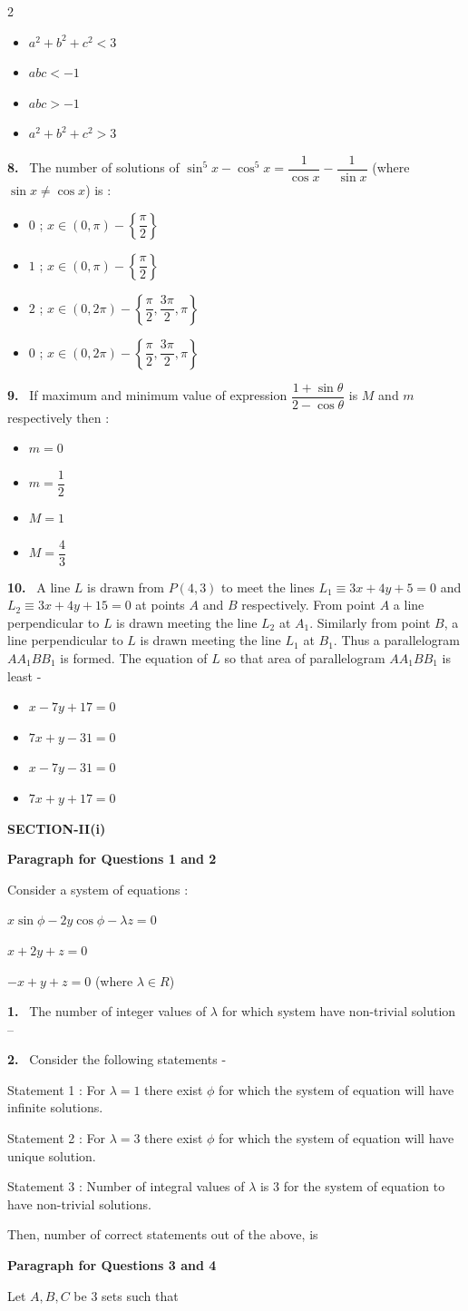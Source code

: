 \documentclass[10pt]{extarticle}
\newcommand{\sect}[1]{\par\smallskip\noindent\textbf{#1}\par}
\newcommand{\qn}[1]{\par\smallskip\noindent\textbf{#1.}~}
\newcommand{\paraq}[2]{\par\smallskip\noindent\textbf{Paragraph for Questions #1 and #2}\par}
\newenvironment{qoptions}{\begin{itemize}[leftmargin=1.8em,itemsep=1pt,topsep=2pt,label={}]}{\end{itemize}}
\newcommand{\opt}[2]{\item[(#1)] #2}
\begin{document}
\begin{multicols}{2}
\begin{qoptions}
\opt{A}{$a^2+b^2+c^2<3$}
\opt{B}{$abc<-1$}
\opt{C}{$abc>-1$}
\opt{D}{$a^2+b^2+c^2>3$}
\end{qoptions}
\qn{8} The number of solutions of $\sin^5x-\cos^5x=\dfrac1{\cos x}-\dfrac1{\sin x}$ (where $\sin x\ne\cos x$) is :
\begin{qoptions}
\opt{A}{$0$ ; $x\in(0,\pi)-\left\{\dfrac\pi2\right\}$}
\opt{B}{$1$ ; $x\in(0,\pi)-\left\{\dfrac\pi2\right\}$}
\opt{C}{$2$ ; $x\in(0,2\pi)-\left\{\dfrac\pi2,\dfrac{3\pi}2,\pi\right\}$}
\opt{D}{$0$ ; $x\in(0,2\pi)-\left\{\dfrac\pi2,\dfrac{3\pi}2,\pi\right\}$}
\end{qoptions}
\qn{9} If maximum and minimum value of expression $\dfrac{1+\sin\theta}{2-\cos\theta}$ is $M$ and $m$ respectively then :
\begin{qoptions}
\opt{A}{$m=0$}
\opt{B}{$m=\dfrac12$}
\opt{C}{$M=1$}
\opt{D}{$M=\dfrac43$}
\end{qoptions}
\qn{10} A line $L$ is drawn from $P(4,3)$ to meet the lines $L_1\equiv3x+4y+5=0$ and $L_2\equiv3x+4y+15=0$ at points $A$ and $B$ respectively. From point $A$ a line perpendicular to $L$ is drawn meeting the line $L_2$ at $A_1$. Similarly from point $B$, a line perpendicular to $L$ is drawn meeting the line $L_1$ at $B_1$. Thus a parallelogram $AA_1BB_1$ is formed. The equation of $L$ so that area of parallelogram $AA_1BB_1$ is least -
\begin{qoptions}
\opt{A}{$x-7y+17=0$}
\opt{B}{$7x+y-31=0$}
\opt{C}{$x-7y-31=0$}
\opt{D}{$7x+y+17=0$}
\end{qoptions}
\sect{SECTION-II(i)}
\paraq{1}{2} Consider a system of equations :

$x\sin\phi-2y\cos\phi-\lambda z=0$

$x+2y+z=0$

$-x+y+z=0$ (where $\lambda\in R$)
\qn{1} The number of integer values of $\lambda$ for which system have non-trivial solution --
\qn{2} Consider the following statements -

Statement 1 : For $\lambda=1$ there exist $\phi$ for which the system of equation will have infinite solutions.

Statement 2 : For $\lambda=3$ there exist $\phi$ for which the system of equation will have unique solution.

Statement 3 : Number of integral values of $\lambda$ is 3 for the system of equation to have non-trivial solutions.

Then, number of correct statements out of the above, is
\paraq{3}{4} Let $A,B,C$ be 3 sets such that


\end{multicols}
\end{document}
